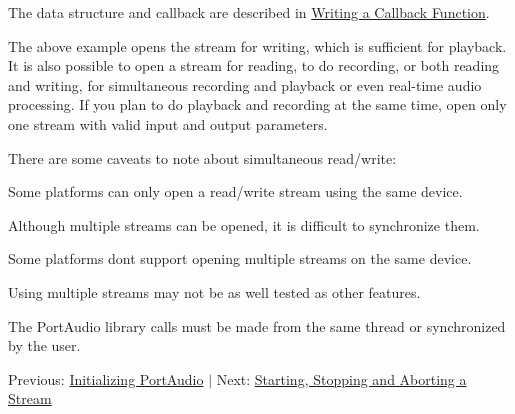 The data structure and callback are described in \hyperlink{writing_a_callback}{Writing a Callback Function}.

The above example opens the stream for writing, which is sufficient for playback. It is also possible to open a stream for reading, to do recording, or both reading and writing, for simultaneous recording and playback or even real-\/time audio processing. If you plan to do playback and recording at the same time, open only one stream with valid input and output parameters.

There are some caveats to note about simultaneous read/write\+:


\begin{DoxyItemize}
\item Some platforms can only open a read/write stream using the same device.
\item Although multiple streams can be opened, it is difficult to synchronize them.
\item Some platforms don\textquotesingle{}t support opening multiple streams on the same device.
\item Using multiple streams may not be as well tested as other features.
\item The Port\+Audio library calls must be made from the same thread or synchronized by the user.
\end{DoxyItemize}

Previous\+: \hyperlink{initializing_portaudio}{Initializing Port\+Audio} $\vert$ Next\+: \hyperlink{start_stop_abort}{Starting, Stopping and Aborting a Stream} 